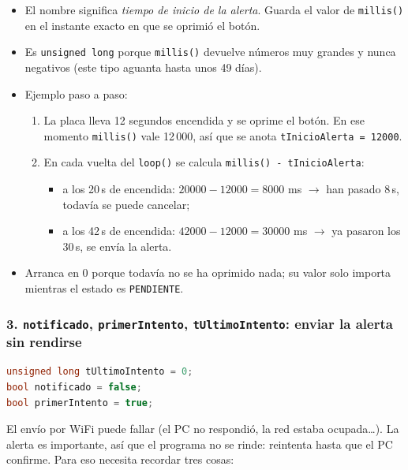 \documentclass[11pt,a4paper]{article}
\begin{document}
\begin{itemize}[leftmargin=*]
  \item El nombre significa \emph{tiempo de inicio de la alerta}. Guarda el valor
        de \texttt{millis()} en el instante exacto en que se oprimió el botón.
  \item Es \texttt{unsigned long} porque \texttt{millis()} devuelve números muy
        grandes y nunca negativos (este tipo aguanta hasta unos 49 días).
  \item Ejemplo paso a paso:
        \begin{enumerate}
          \item La placa lleva 12 segundos encendida y se oprime el botón. En ese
                momento \texttt{millis()} vale 12\,000, así que se anota
                \texttt{tInicioAlerta = 12000}.
          \item En cada vuelta del \texttt{loop()} se calcula
                \texttt{millis() - tInicioAlerta}:
                \begin{itemize}
                  \item a los 20\,s de encendida: $20000 - 12000 = 8000$ ms
                        $\rightarrow$ han pasado 8\,s, todavía se puede cancelar;
                  \item a los 42\,s de encendida: $42000 - 12000 = 30000$ ms
                        $\rightarrow$ ya pasaron los 30\,s, se envía la alerta.
                \end{itemize}
        \end{enumerate}
  \item Arranca en 0 porque todavía no se ha oprimido nada; su valor solo importa
        mientras el estado es \texttt{PENDIENTE}.
\end{itemize}

\subsubsection*{3. \texttt{notificado}, \texttt{primerIntento}, \texttt{tUltimoIntento}: enviar la alerta sin rendirse}

\begin{lstlisting}[language=C++,numbers=none]
unsigned long tUltimoIntento = 0;
bool notificado = false;
bool primerIntento = true;
\end{lstlisting}

El envío por WiFi puede fallar (el PC no respondió, la red estaba ocupada\ldots).
La alerta es importante, así que el programa no se rinde: reintenta hasta que el PC
confirme. Para eso necesita recordar tres cosas:
\end{document}
